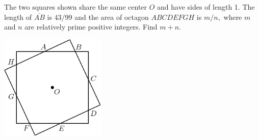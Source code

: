 The two squares shown share the same center $O$ and have sides of length 1. The length of $\overline{AB}$ is $43/99$ and the area of octagon $ABCDEFGH$ is $m/n,$ where $m$ and $n$ are relatively prime positive integers.  Find $m+n.$
\begin{center}
\includegraphics[width = 50.400000000000006mm]{img/fig0.png}
\end{center}
